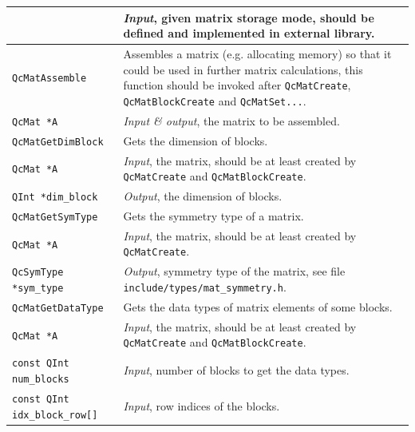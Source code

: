 \documentclass[a4paper,11pt,twoside,openright]{book}
\begin{document}
\begin{center}
\begin{longtable}{l|p{}}
      & \textsl{Input}, given matrix storage mode, should be defined and
        implemented in external library.\\
    \hline
%
    \verb|QcMatAssemble|\index{\texttt{QcMatAssemble}} %
      & Assembles a matrix (e.g. allocating memory) so that it could be used
        in further matrix calculations, this function should be invoked after
        \verb|QcMatCreate|, \verb|QcMatBlockCreate| and \verb|QcMatSet...|.\\
    \hspace*{2ex}\verb|QcMat *A| %
      & \textsl{Input \& output}, the matrix to be assembled.\\
    \hline
%
    \verb|QcMatGetDimBlock|\index{\texttt{QcMatGetDimBlock}} %
      & Gets the dimension of blocks.\\
    \hspace*{2ex}\verb|QcMat *A| %
      & \textsl{Input}, the matrix, should be at least created by \verb|QcMatCreate|
        and \verb|QcMatBlockCreate|.\\
    \hspace*{2ex}\verb|QInt *dim_block| %
      & \textsl{Output}, the dimension of blocks.\\
    \hline
%
    \verb|QcMatGetSymType|\index{\texttt{QcMatGetSymType}} %
      & Gets the symmetry type of a matrix.\\
    \hspace*{2ex}\verb|QcMat *A| %
      & \textsl{Input}, the matrix, should be at least created by \verb|QcMatCreate|.\\
    \hspace*{2ex}\verb|QcSymType *sym_type| %
      & \textsl{Output}, symmetry type of the matrix, see file
        \verb|include/types/mat_symmetry.h|.\\
    \hline
%
    \verb|QcMatGetDataType|\index{\texttt{QcMatGetDataType}} %
      & Gets the data types of matrix elements of some blocks.\\
    \hspace*{2ex}\verb|QcMat *A| %
      & \textsl{Input}, the matrix, should be at least created by \verb|QcMatCreate|
        and \verb|QcMatBlockCreate|.\\
    \hspace*{2ex}\verb|const QInt num_blocks| %
      & \textsl{Input}, number of blocks to get the data types.\\
    \hspace*{2ex}\verb|const QInt idx_block_row[]| %
      & \textsl{Input}, row indices of the blocks.\\

\end{longtable}
\end{center}
\end{document}
